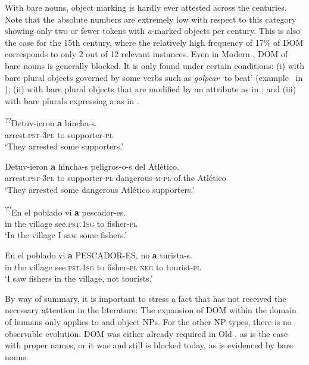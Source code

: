 \documentclass[output=paper]{LSP/langsci}
\begin{document}
With bare nouns, object marking is hardly ever attested across the centuries. Note that the absolute numbers are extremely low with respect to this category showing only two or fewer tokens with \textit{a}-marked objects per century. This is also the case for the 15th century, where the relatively high frequency of 17\% of DOM corresponds to only 2 out of 12 relevant instances. Even in Modern , DOM of bare nouns is generally blocked. It is only found under certain conditions: (i) with bare plural objects governed by some verbs such as \textit{golpear} ‘to beat’ (\cf example~ in ); (ii) with bare plural objects that are modified by an attribute as in ; and (iii) with bare plurals expressing a  as in .

\ea \label{08-ga-ex:11}
\ea
\gll \textup{\textsuperscript{??}}Detuv-ieron \textbf{a} hincha-s.\\
 arrest.\textsc{pst-3pl} to supporter-\textsc{pl}\\
 \glt ‘They arrested some supporters.’
 
\ex 
\gll Detuv-ieron \textbf{a} hincha-s peligros-o-s del Atlético.\\
 arrest.\textsc{pst-3pl} to supporter-\textsc{pl} dangerous-\textsc{m-pl} of.the Atlético\\%
\glt ‘They arrested some dangerous Atlético supporters.’
\citep[87]{Leonetti2004Specificity}
\z
\z

\ea \label{08-ga-ex:12}
\ea
\gll \textup{\textsuperscript{??}}En el poblado vi \textbf{a} pescador-es.\\
 in the village see.\textsc{pst.1sg} to fisher-\textsc{pl}\\
\glt ‘In the village I saw some fishers.’

\ex
\gll En el poblado vi \textbf{a} PESCADOR-ES, no \textbf{a} turista-s.\\
 in the village see.\textsc{pst.1sg} to fisher-\textsc{pl} \textsc{neg} to tourist\textsc{-pl}\\
\glt ‘I saw fishers in the village, not tourists.’
\citep[88]{Leonetti2004Specificity}
\z
\z

By way of summary, it is important to stress a fact that has not received the necessary attention in the literature: The expansion of DOM within the domain of humans only applies to  and  object NPs. For the other NP types, there is no observable evolution. DOM was either already required in Old , as is the case with proper names, or it was and still is blocked today, as is evidenced by bare nouns.
\end{document}
